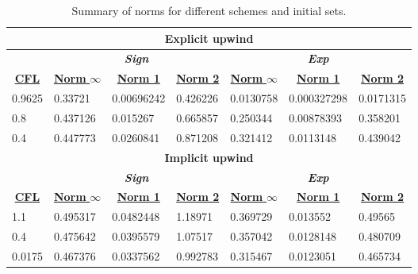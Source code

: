		\begin{table}[]
			\centering
			\caption{Summary of norms for different schemes and initial sets.}
			\label{tab:cfl_norms}
					\begin{tabular}{|l|l|l|l|l|l|l|}
						\hline
						\multicolumn{7}{|c|}{\textbf{Explicit upwind}} \\ \hline
						& \multicolumn{3}{|c|}{\textit{\textbf{Sign}}} & \multicolumn{3}{|c|}{\textit{\textbf{Exp}}} \\ \hline
						\multicolumn{1}{|c|}{{\ul \textbf{CFL}}} & \multicolumn{1}{|c|}{{\ul \textbf{Norm }$\infty$}} & \multicolumn{1}{c}{{\ul \textbf{Norm 1}}} & \multicolumn{1}{|c|}{{\ul \textbf{Norm 2}}} & \multicolumn{1}{|c|}{{\ul \textbf{Norm }$\infty$}} & \multicolumn{1}{|c|}{{\ul \textbf{Norm 1}}} & \multicolumn{1}{|c|}{{\ul \textbf{Norm 2}}} \\ \hline \hline
						0.9625 & 0.33721 & 0.00696242 & 0.426226 & 0.0130758 & 0.000327298 & 0.0171315 \\ \hline
						0.8 & 0.437126 & 0.015267 & 0.665857 & 0.250344 & 0.00878393 & 0.358201 \\ \hline
						0.4 & 0.447773 & 0.0260841 & 0.871208 & 0.321412 & 0.0113148 & 0.439042 \\ \hline \hline
						
						\multicolumn{7}{|c|}{\textbf{Implicit upwind}} \\ \hline
						& \multicolumn{3}{|c|}{\textit{\textbf{Sign}}} & \multicolumn{3}{|c|}{\textit{\textbf{Exp}}} \\ \hline
						\multicolumn{1}{|c|}{{\ul \textbf{CFL}}} & \multicolumn{1}{|c|}{{\ul \textbf{Norm }$\infty$}} & \multicolumn{1}{|c|}{{\ul \textbf{Norm 1}}} & \multicolumn{1}{|c|}{{\ul \textbf{Norm 2}}} & \multicolumn{1}{|c|}{{\ul \textbf{Norm }$\infty$}} & \multicolumn{1}{|c|}{{\ul \textbf{Norm 1}}} & \multicolumn{1}{||c|}{{\ul \textbf{Norm 2}}} \\ \hline \hline
						1.1 & 0.495317 & 0.0482448 & 1.18971 & 0.369729 & 0.013552 & 0.49565 \\ \hline
						0.4 & 0.475642 & 0.0395579 & 1.07517 & 0.357042 & 0.0128148 & 0.480709 \\ \hline
						0.0175 & 0.467376 & 0.0337562 & 0.992783 & 0.315467 & 0.0123051 & 0.465734 \\ \hline \hline
						

\end{tabular}
\end{table}
